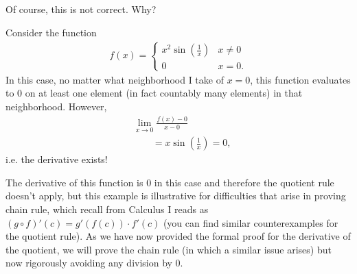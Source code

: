 \documentclass{ximera}
\begin{document}
Of course, this is not correct.  Why?

\begin{example}
    Consider the function 
    \begin{align*}
        f(x) = \begin{cases}
            x^2 \sin\left(\frac1x\right) & x\neq 0 \\
            0 & x=0.
        \end{cases}       
    \end{align*}
    In this case, no matter what neighborhood I take of $x = 0$, this function evaluates to $0$ on at least one element (in fact countably many elements) in that neighborhood.  However,
    \begin{align*}
        &\lim\limits_{x\to 0} \frac{f(x) - 0}{x-0}
        \\
        &\qquad = x \sin\left(\frac1x\right) = 0,
    \end{align*}
    i.e. the derivative exists!
\end{example}
The derivative of this function is $0$ in this case and therefore the quotient rule doesn't apply, but this example is illustrative for difficulties that arise in proving chain rule, which recall from Calculus I reads as $(g\circ f)'(c) = g'(f(c))\cdot f'(c)$ (you can find similar counterexamples for the quotient rule). 
As we have now provided the formal proof for the derivative of the quotient, we will prove the chain rule (in which a similar issue arises) but now rigorously avoiding any division by $0$.
\end{document}
